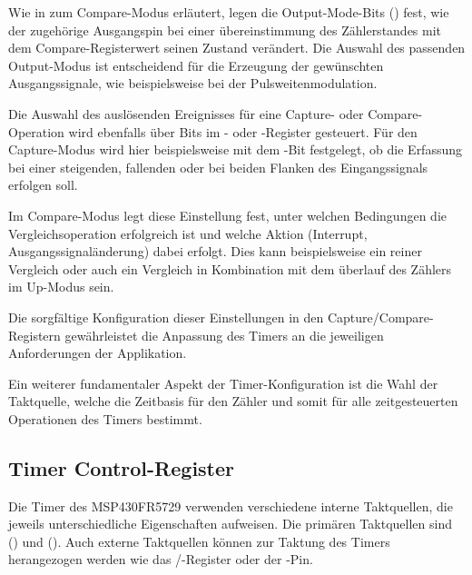 Wie in  zum Compare-Modus erl\"autert, legen die Output-Mode-Bits () fest, wie der zugeh\"orige Ausgangspin bei einer \"ubereinstimmung des Z\"ahlerstandes mit dem Compare-Registerwert seinen Zustand ver\"andert. Die Auswahl des passenden Output-Modus ist entscheidend f\"ur die Erzeugung der gew\"unschten Ausgangssignale, wie beispielsweise bei der Pulsweitenmodulation.

\newpage
Die Auswahl des ausl\"osenden Ereignisses f\"ur eine Capture- oder Compare-Operation wird ebenfalls \"uber Bits im - oder -Register gesteuert. F\"ur den Capture-Modus wird hier beispielsweise mit dem -Bit festgelegt, ob die Erfassung bei einer steigenden, fallenden oder bei beiden Flanken des Eingangssignals erfolgen soll. 

Im Compare-Modus legt diese Einstellung fest, unter welchen Bedingungen die Vergleichsoperation erfolgreich ist und welche Aktion (Interrupt, Ausgangssignal\"anderung) dabei erfolgt. Dies kann beispielsweise ein reiner Vergleich oder auch ein Vergleich in Kombination mit dem \"uberlauf des Z\"ahlers im Up-Modus sein.\\

Die sorgf\"altige Konfiguration dieser Einstellungen in den Capture/Compare-Registern gew\"ahrleistet die Anpassung des Timers an die jeweiligen Anforderungen der Applikation.

Ein weiterer fundamentaler Aspekt der Timer-Konfiguration ist \ua die Wahl der Taktquelle, welche die Zeitbasis f\"ur den Z\"ahler und somit f\"ur alle zeitgesteuerten Operationen des Timers bestimmt.\AI

\subsection{Timer Control-Register}
\label{sec:TimerControlRegister}

Die Timer des MSP430FR5729 verwenden verschiedene interne Taktquellen, die jeweils unterschiedliche Eigenschaften aufweisen. Die prim\"aren Taktquellen sind  () und  (). Auch externe Taktquellen k\"onnen zur Taktung des Timers herangezogen werden wie \zB das /-Register oder der -Pin. \\

